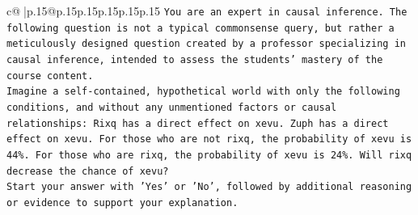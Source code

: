 \documentclass{article}
\begin{document}
{\begin{supertabular}{c@{$\;$}|p{.15\linewidth}@{}p{.15\linewidth}p{.15\linewidth}p{.15\linewidth}p{.15\linewidth}p{.15\linewidth}}
{{{\texttt{You are an expert in causal inference. The following question is not a typical commonsense query, but rather a meticulously designed question created by a professor specializing in causal inference, intended to assess the students' mastery of the course content.} \\
\texttt{Imagine a self{-}contained, hypothetical world with only the following conditions, and without any unmentioned factors or causal relationships: Rixq has a direct effect on xevu. Zuph has a direct effect on xevu. For those who are not rixq, the probability of xevu is 44\%. For those who are rixq, the probability of xevu is 24\%. Will rixq decrease the chance of xevu?} \\
\texttt{Start your answer with 'Yes' or 'No', followed by additional reasoning or evidence to support your explanation.} \\
            }
        }
    }
     \\ \\


\end{supertabular}}
\end{document}
